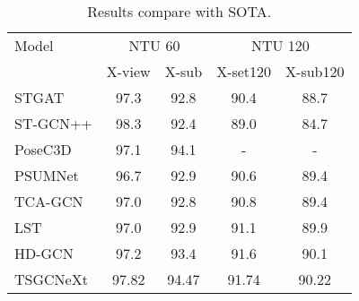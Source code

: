 \documentclass[10pt,twocolumn,letterpaper]{article}
\begin{document}
 \begin{table}
\centering
  \caption{Results compare with SOTA.}
  \label{tab:result}
    \begin{tabular}{l|cc|cc}
    \toprule
    Model & \multicolumn{2}{c}{NTU 60} & \multicolumn{2}{c}{NTU 120} \\
         & X-view &X-sub & X-set120 & X-sub120 \\
    \midrule	
    STGAT &97.3& 92.8& 90.4 & 88.7\\
    ST-GCN++ &98.3&92.4&89.0&84.7\\
    PoseC3D&97.1&94.1&-&-\\
    PSUMNet &96.7 &92.9& 90.6 & 89.4\\
    TCA-GCN &97.0 &92.8 & 90.8 & 89.4\\
    LST &97.0 &92.9 & 91.1 & 89.9\\
    HD-GCN &97.2 &93.4 & 91.6 & 90.1\\
    \midrule
    TSGCNeXt& 97.82 & \color{red}94.47 & \color{red}91.74 & \color{red}90.22 \\
    \bottomrule
    \end{tabular}\label{tab:newcompare}\end{table} 
\end{document}
